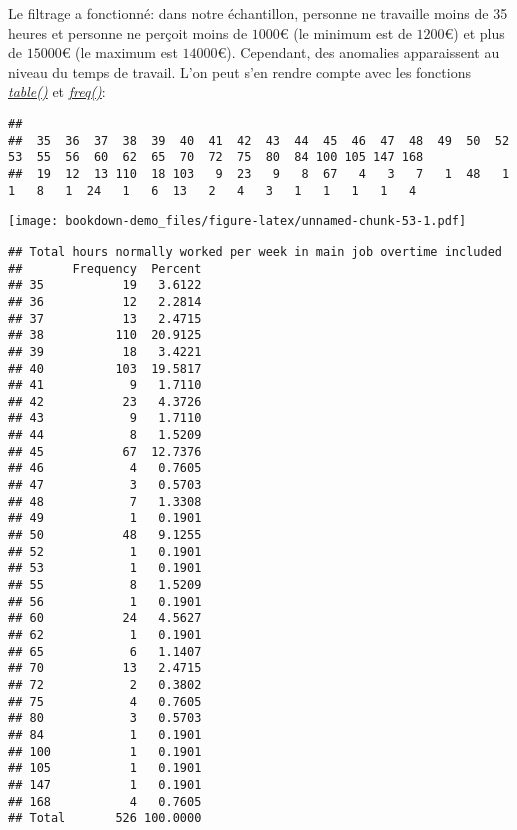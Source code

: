 \documentclass[
]{book}
\newenvironment{Shaded}{\begin{snugshade}}{\end{snugshade}}
\newcommand{\FunctionTok}[1]{\textcolor[rgb]{0.00,0.00,0.00}{#1}}
\newcommand{\NormalTok}[1]{#1}
\newcommand{\SpecialCharTok}[1]{\textcolor[rgb]{0.00,0.00,0.00}{#1}}
\begin{document}
Le filtrage a fonctionné: dans notre échantillon, personne ne travaille moins de 35 heures et personne ne perçoit moins de \(1000€\) (le minimum est de \(1200€\)) et plus de \(15000€\) (le maximum est \(14000€\)). Cependant, des anomalies apparaissent au niveau du temps de travail. L'on peut s'en rendre compte avec les fonctions \href{https://www.rdocumentation.org/packages/base/versions/3.6.2/topics/table}{\emph{table()}} et \href{https://www.rdocumentation.org/packages/descr/versions/1.1.5/topics/freq}{\emph{freq()}}:

\begin{Shaded}
\end{Shaded}

\begin{verbatim}
## 
##  35  36  37  38  39  40  41  42  43  44  45  46  47  48  49  50  52  53  55  56  60  62  65  70  72  75  80  84 100 105 147 168 
##  19  12  13 110  18 103   9  23   9   8  67   4   3   7   1  48   1   1   8   1  24   1   6  13   2   4   3   1   1   1   1   4
\end{verbatim}

\begin{Shaded}
\end{Shaded}

\texttt{[image: bookdown-demo\_files/figure-latex/unnamed-chunk-53-1.pdf]}

\begin{verbatim}
## Total hours normally worked per week in main job overtime included 
##       Frequency  Percent
## 35           19   3.6122
## 36           12   2.2814
## 37           13   2.4715
## 38          110  20.9125
## 39           18   3.4221
## 40          103  19.5817
## 41            9   1.7110
## 42           23   4.3726
## 43            9   1.7110
## 44            8   1.5209
## 45           67  12.7376
## 46            4   0.7605
## 47            3   0.5703
## 48            7   1.3308
## 49            1   0.1901
## 50           48   9.1255
## 52            1   0.1901
## 53            1   0.1901
## 55            8   1.5209
## 56            1   0.1901
## 60           24   4.5627
## 62            1   0.1901
## 65            6   1.1407
## 70           13   2.4715
## 72            2   0.3802
## 75            4   0.7605
## 80            3   0.5703
## 84            1   0.1901
## 100           1   0.1901
## 105           1   0.1901
## 147           1   0.1901
## 168           4   0.7605
## Total       526 100.0000
\end{verbatim}
\end{document}
